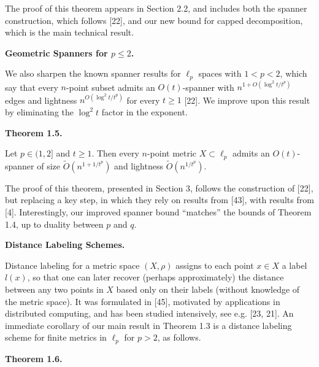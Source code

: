 \documentclass[10pt,a4paper]{amsart}
\begin{document}
The proof of this theorem appears in Section 2.2, and includes both the spanner construction, which follows [22], and our new bound for capped decomposition, which is the main technical result.
\par
\par
\par
\par\medskip\noindent\textbf{Geometric Spanners for $p\leq 2$.}\par
We also sharpen the known spanner results for $\ell_{p}$ spaces with $1<p<2$, which say that every $n$-point subset admits an $O(t)$-spanner with $n^{1+O(\log^{2}{t}/t^{p})}$ edges and lightness $n^{O(\log^{2}{t}/t^{p})}$ for every $t\geq 1$ [22]. We improve upon this result by eliminating the $\log^{2}{t}$ factor in the exponent.
\par
\par
\par\medskip\noindent\textbf{Theorem 1.5.}\par
Let $p\in(1,2]$ and $t\geq 1$. Then every $n$-point metric $X\subset\ell_{p}$ admits an $O(t)$-spanner of size $\tilde{O}(n^{1+1/t^{p}})$ and lightness $\tilde{O}(n^{1/t^{p}})$.
\par
\par
\par
The proof of this theorem, presented in Section 3, follows the construction of [22], but replacing a key step, in which they rely on results from [43], with results from [4]. Interestingly, our improved spanner bound “matches” the bounds of Theorem 1.4, up to duality between $p$ and $q$.
\par
\par
\par
\par\medskip\noindent\textbf{Distance Labeling Schemes.}\par
Distance labeling for a metric space $(X,\rho)$ assigns to each point $x\in X$ a label $l(x)$, so that one can later recover (perhaps approximately) the distance between any two points in $X$ based only on their labels (without knowledge of the metric space). It was formulated in [45], motivated by applications in distributed computing, and has been studied intensively, see e.g. [23, 21]. An immediate corollary of our main result in Theorem 1.3 is a distance labeling scheme for finite metrics in $\ell_{p}$ for $p>2$, as follows.
\par
\par
\par\medskip\noindent\textbf{Theorem 1.6.}\par
\end{document}
